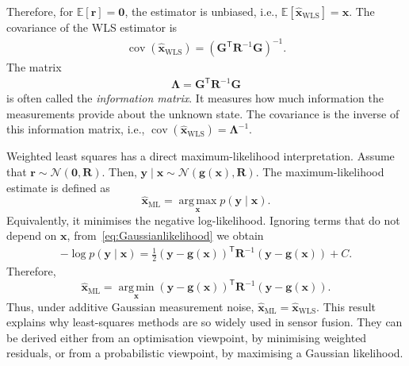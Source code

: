Therefore, for $\mathbb{E}
\left[\mathbf{r}\right]
=\mathbf{0}$, the estimator is unbiased, i.e., $\mathbb{E} \left[\widehat{\mathbf{x}}_{\mathrm{WLS}} \right] = \mathbf{x}$. The covariance of the WLS estimator is
\begin{align}
\operatorname{cov}
\left(
\widehat{\mathbf{x}}_{\mathrm{WLS}}
\right)
=
\left(
\mathbf{G}^{\mathsf T}
\mathbf{R}^{-1}
\mathbf{G}
\right)^{-1}.
\end{align}
The matrix
\begin{align}
\mathbf{\Lambda}
=
\mathbf{G}^{\mathsf T}
\mathbf{R}^{-1}
\mathbf{G}
\end{align}
is often called the \emph{information matrix}. It measures how much information the measurements provide about the unknown state. The covariance is the inverse of this information matrix, i.e., $\operatorname{cov} \left( \widehat{\mathbf{x}}_{\mathrm{WLS}} \right) = \mathbf{\Lambda}^{-1}$.

Weighted least squares has a direct maximum-likelihood interpretation. Assume that $\mathbf{r}
\sim
\mathcal{N}
\left(
\mathbf{0},
\mathbf{R}
\right)$. Then, $\mathbf{y}\mid\mathbf{x}
\sim
\mathcal{N}
\left(
\mathbf{g}(\mathbf{x}),
\mathbf{R}
\right)$.
The maximum-likelihood estimate is defined as
\begin{equation}
\widehat{\mathbf{x}}_{\mathrm{ML}}
=
\operatorname*{arg\,max}_{\mathbf{x}}
p(\mathbf{y}\mid\mathbf{x}).
\end{equation}
Equivalently, it minimises the negative log-likelihood. Ignoring terms that do not depend on $\mathbf{x}$, from~\eqref{eq:Gaussianlikelihood} we obtain
\begin{align*}
-\log p(\mathbf{y}\mid\mathbf{x}) =
\frac{1}{2}
\left(\mathbf{y} - \mathbf{g}(\mathbf{x}) \right)^{\mathsf T}
\mathbf{R}^{-1}
\left(
\mathbf{y}
-
\mathbf{g}(\mathbf{x})
\right)
+
C.
\end{align*}
Therefore,
\begin{equation}
\widehat{\mathbf{x}}_{\mathrm{ML}}
=
\operatorname*{arg\,min}_{\mathbf{x}}
\left(
\mathbf{y}
-
\mathbf{g}(\mathbf{x})
\right)^{\mathsf T}
\mathbf{R}^{-1}
\left(
\mathbf{y}
-
\mathbf{g}(\mathbf{x})
\right).
\end{equation}
Thus, under additive Gaussian measurement noise, $\widehat{\mathbf{x}}_{\mathrm{ML}} = \widehat{\mathbf{x}}_{\mathrm{WLS}}$. This result explains why least-squares methods are so widely used in sensor fusion. They can be derived either from an optimisation viewpoint, by minimising weighted residuals, or from a probabilistic viewpoint, by maximising a Gaussian likelihood.

